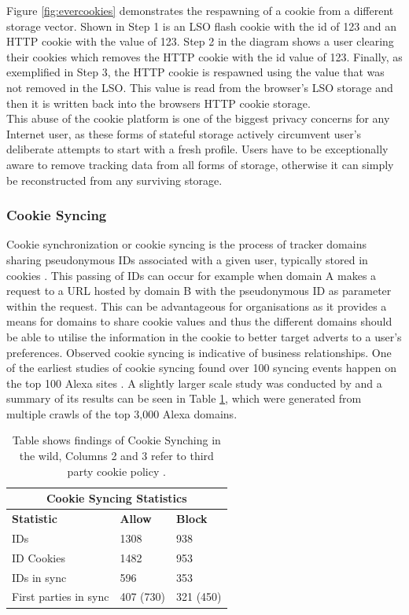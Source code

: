 \documentclass[12pt]{article}
\begin{document}
Figure \ref{fig:evercookies} demonstrates the respawning of a cookie from a different storage vector. Shown in Step 1 is an LSO flash cookie with the id of 123 and an HTTP cookie with the value of 123. Step 2 in the diagram shows a user clearing their cookies which removes the HTTP cookie with the id value of 123. Finally, as exemplified in Step 3, the HTTP cookie is respawned using the value that was not removed in the LSO. This value is read from the browser's LSO storage and then it is written back into the browsers HTTP cookie storage. \\

This abuse of the cookie platform is one of the biggest privacy concerns for any Internet user, as these forms of stateful storage actively circumvent user's deliberate attempts to start with a fresh profile. Users have to be exceptionally aware to remove tracking data from all forms of storage, otherwise it can simply be reconstructed from any surviving storage. 

\subsubsection{Cookie Syncing}
Cookie synchronization or cookie syncing is the process of tracker domains sharing pseudonymous IDs associated with a given user, typically stored in cookies \parencite{webNeverForgets}. This passing of IDs can occur for example when domain A makes a request to a URL hosted by domain B with the pseudonymous ID as parameter within the request. This can be advantageous for organisations as it provides a means for domains to share cookie values and thus the different domains should be able to utilise the information in the cookie to better target adverts to a user's preferences. Observed cookie syncing is indicative of business relationships.  One of the earliest studies of cookie syncing found over 100 syncing events happen on the top 100 Alexa sites \parencite{sellingPrivacy}. A slightly larger scale study was conducted by \parencite{webNeverForgets} and a summary of its results can be seen in Table \ref{table:1}, which were generated from multiple crawls of the top 3,000 Alexa domains. \\

{
\begin{table} [H]
\centering
\begin{tabular}{ |p{4cm}|p{4cm}|p{4cm}|  }
\hline
\multicolumn{3}{|c|}{\textbf{Cookie Syncing Statistics}} \\
\hline
\textbf{Statistic} & \textbf{Allow} & \textbf{Block} \\
\hline
IDs & 1308 & 938 \\
\hline
ID Cookies & 1482   & 953 \\
\hline
IDs in sync & 596 & 353 \\
\hline
First parties in sync & 407 (730) & 321 (450) \\
\hline
\end{tabular}
\caption{Table shows findings of Cookie Synching in the wild, Columns 2 and 3 refer to third party cookie policy \parencite{webNeverForgets}.}
\label{table:1}
\end{table}
}
\end{document}

